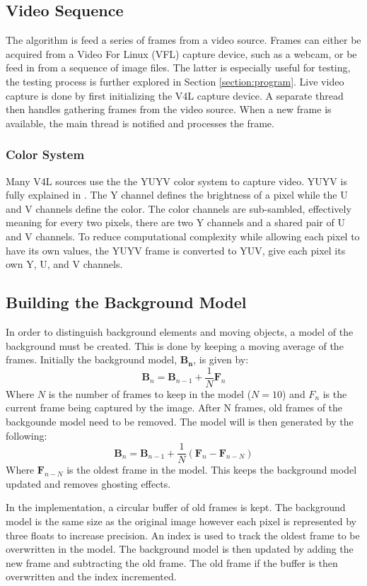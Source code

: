 \documentclass[journal]{IEEEtran}
\begin{document}
\subsection{Video Sequence}
The algorithm is feed a series of frames from a video source. Frames can either be acquired from a Video For
Linux (VFL) capture device, such as a webcam, or be feed in from a sequence of image files. 
The latter is especially useful for testing, the testing process is further explored in Section 
\ref{section:program}. Live video capture is done by first initializing the V4L capture device. A separate
thread then handles gathering frames from the video source. When a new frame is available, the main thread
is notified and processes the frame. 

\subsubsection{Color System}
Many V4L sources use the the YUYV color system to capture video. YUYV is fully explained in \cite{loc_yuy2_2013}. The Y channel defines the brightness of a pixel while the U and V channels
define the color. The color channels are sub-sambled, effectively meaning for every two pixels, there
are two Y channels and a shared pair of U and V channels. To reduce computational complexity while
allowing each pixel to have its own values, the YUYV frame is converted to YUV, give each pixel
its own Y, U, and V channels.

\subsection{Building the Background Model}
In order to distinguish background elements and moving objects, a model of the background must be 
created. This  is done by keeping a moving average of the frames. Initially the background model, 
$\mathbf{B_n}$,  is given by:
$$
\mathbf{B}_n = \mathbf{B}_{n-1} + \frac{1}{N}\mathbf{F}_n
$$
Where $N$ is the number of frames to keep in the model ($N=10$) and $\mathbf{}{F_n}$ is the current frame being 
captured by the image. After N frames, old frames of the backgounde model need to be removed. The model will is then  generated by the following:
$$
\mathbf{B}_n = \mathbf{B}_{n-1} + \frac{1}{N}(\mathbf{F}_n - \mathbf{F}_{n-N})
$$
Where $ \mathbf{F}_{n-N}$ is the oldest frame in the model. This keeps the background model updated and removes
ghosting effects. 

In the implementation, a circular buffer of old frames is kept. The background model is the same
size as the original image however each pixel is represented by three floats to increase precision. An index
is used to track the oldest frame to be overwritten in the model. The background model is then updated by
adding the new frame and subtracting the old frame. The old frame if the buffer is then overwritten and the
index incremented. 
\end{document}

